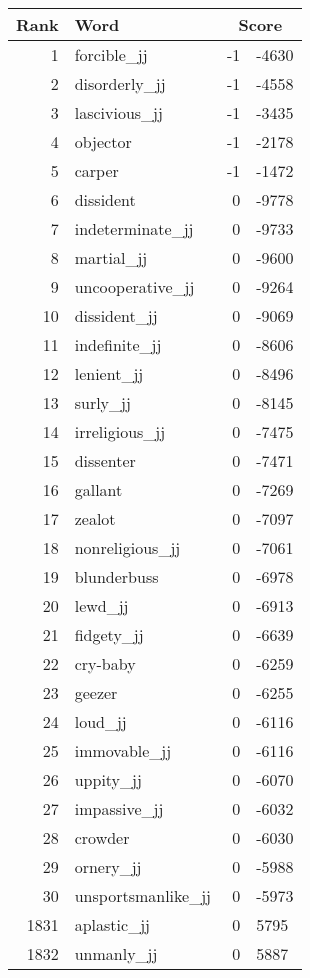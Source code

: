\begin{longtable}[!htbp]{| rlr@{.}l |}
    \hline
    \textbf{Rank} & \textbf{Word} & \multicolumn{2}{c|}{\textbf{Score}} \\
    \hline
    \endhead
    1 & forcible\_jj & -1 & -4630 \\
    2 & disorderly\_jj & -1 & -4558 \\
    3 & lascivious\_jj & -1 & -3435 \\
    4 & objector & -1 & -2178 \\
    5 & carper & -1 & -1472 \\
    6 & dissident & 0 & -9778 \\
    7 & indeterminate\_jj & 0 & -9733 \\
    8 & martial\_jj & 0 & -9600 \\
    9 & uncooperative\_jj & 0 & -9264 \\
    10 & dissident\_jj & 0 & -9069 \\
    11 & indefinite\_jj & 0 & -8606 \\
    12 & lenient\_jj & 0 & -8496 \\
    13 & surly\_jj & 0 & -8145 \\
    14 & irreligious\_jj & 0 & -7475 \\
    15 & dissenter & 0 & -7471 \\
    16 & gallant & 0 & -7269 \\
    17 & zealot & 0 & -7097 \\
    18 & nonreligious\_jj & 0 & -7061 \\
    19 & blunderbuss & 0 & -6978 \\
    20 & lewd\_jj & 0 & -6913 \\
    21 & fidgety\_jj & 0 & -6639 \\
    22 & cry-baby & 0 & -6259 \\
    23 & geezer & 0 & -6255 \\
    24 & loud\_jj & 0 & -6116 \\
    25 & immovable\_jj & 0 & -6116 \\
    26 & uppity\_jj & 0 & -6070 \\
    27 & impassive\_jj & 0 & -6032 \\
    28 & crowder & 0 & -6030 \\
    29 & ornery\_jj & 0 & -5988 \\
    30 & unsportsmanlike\_jj & 0 & -5973 \\
    1831 & aplastic\_jj & 0 & 5795 \\
    1832 & unmanly\_jj & 0 & 5887 \\

\end{longtable}
